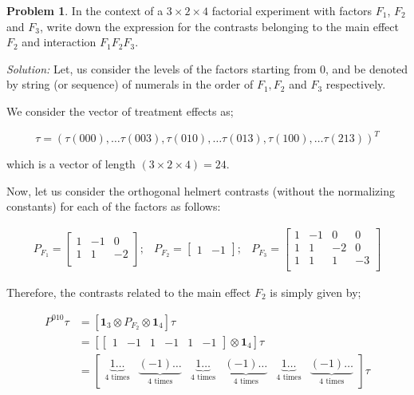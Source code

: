 \documentclass[12pt]{article}
\theoremstyle{definition}
\newtheorem*{prb}{Problem}
\newenvironment{problem}{
\begin{tcolorbox}[colback=blue!5!white,colframe=blue!75!black, parbox = true] \begin{prb}  }{\end{prb}\end{tcolorbox} }
\newenvironment{answer}{\textit{Solution: }\quad }{ \hfill \qedsymbol}
\begin{document}
\begin{problem}
	In the context of a $3 \times 2 \times 4$ factorial experiment with factors $F_1$, $F_2$ and $F_3$, write down the expression for the contrasts belonging to the main effect $F_2$ and interaction $F_1F_2F_3$.
\end{problem}

\begin{answer}
	Let, us consider the levels of the factors starting from $0$, and be denoted by string (or sequence) of numerals in the order of $F_1, F_2$ and $F_3$ respectively.

	We consider the vector of treatment effects as;

	$$\tau = \left( \tau(000), \dots \tau(003), \tau(010), \dots \tau(013), \tau(100), \dots \tau(213) \right)^{T}$$

	which is a vector of length $(3 \times 2 \times 4) = 24$.

	Now, let us consider the orthogonal helmert contrasts (without the normalizing constants) for each of the factors as follows:

	$$\begin{array}{lll}
		P_{F_1} = \begin{bmatrix}
			1 & -1 & 0\\
			1 & 1 & -2\\
		\end{bmatrix};
		& 
		P_{F_2} = \begin{bmatrix}
			1 & -1
		\end{bmatrix};
		&
		P_{F_3} = \begin{bmatrix}
			1 & -1 & 0 & 0\\
			1 & 1 & -2 & 0\\
			1 & 1 & 1 & -3\\
		\end{bmatrix}
	\end{array}$$

	Therefore, the contrasts related to the main effect $F_2$ is simply given by;

	\begin{align*}
		P^{010}\tau 
		& = \left[\bm{1}_{3} \otimes P_{F_2} \otimes \bm{1}_{4}\right]\tau \\
		& = \left[\begin{bmatrix}
			1 & -1 & 1 & -1 & 1 & -1
		\end{bmatrix} \otimes \bm{1}_4\right] \tau \\
		& = \begin{bmatrix}
			\underbrace{1 \dots}_{4 \text{ times}} 
			& \underbrace{(-1) \dots}_{4 \text{ times}}
			& \underbrace{1 \dots}_{4 \text{ times}} 
			& \underbrace{(-1) \dots}_{4 \text{ times}}
			& \underbrace{1 \dots}_{4 \text{ times}} 
			& \underbrace{(-1) \dots}_{4 \text{ times}}
		\end{bmatrix} \tau\\
	\end{align*}


\end{answer}
\end{document}
